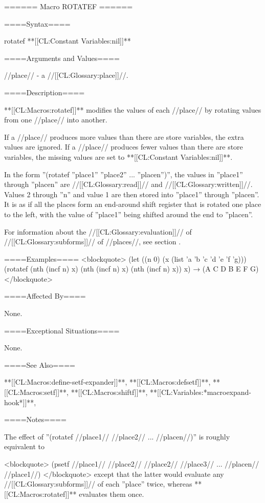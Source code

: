 ====== Macro ROTATEF ======

====Syntax====

\DefmacWithValues rotatef {} {**[[CL:Constant Variables:nil]]**}

====Arguments and Values====

//place// - a //[[CL:Glossary:place]]//.

====Description====

**[[CL:Macros:rotatef]]** modifies the values of each //place// by rotating values from one //place// into another.

If a //place// produces more values than there are store variables, the extra values are ignored. If a //place// produces fewer values than there are store variables, the missing values are set to **[[CL:Constant Variables:nil]]**.

In the form ''(rotatef ''place1'' ''place2'' ... ''placen'')'', the values in ''place1'' through ''placen'' are //[[CL:Glossary:read]]// and //[[CL:Glossary:written]]//. Values 2 through ''n'' and value 1 are then stored into ''place1'' through ''placen''. It is as if all the places form an end-around shift register that is rotated one place to the left, with the value of ''place1'' being shifted around the end to ''placen''.

For information about the //[[CL:Glossary:evaluation]]// of //[[CL:Glossary:subforms]]// of //places//, see section {\secref\GenRefSubFormEval}.


====Examples==== <blockquote> (let ((n 0) (x (list 'a 'b 'c 'd 'e 'f 'g))) (rotatef (nth (incf n) x) (nth (incf n) x) (nth (incf n) x)) x) → (A C D B E F G) </blockquote>

====Affected By====

None.

====Exceptional Situations====

None.

====See Also====

**[[CL:Macros:define-setf-expander]]**, **[[CL:Macros:defsetf]]**, **[[CL:Macros:setf]]**, **[[CL:Macros:shiftf]]**, **[[CL:Variables:*macroexpand-hook*]]**, {\secref\GeneralizedReference}

====Notes====

The effect of ''(rotatef //place1// //place2// ... //placen//)'' is roughly equivalent to

<blockquote> (psetf //place1// //place2// //place2// //place3// ... //placen// //place1//) </blockquote> except that the latter would evaluate any //[[CL:Glossary:subforms]]// of each ''place'' twice, whereas **[[CL:Macros:rotatef]]** evaluates them once.

 
